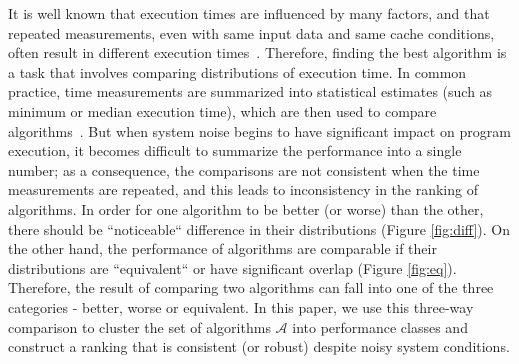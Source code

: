 \documentclass[conference]{IEEEtran}
\begin{document}
It is well known that execution times are influenced by many factors, and that repeated measurements, even with same input data and same cache conditions, often result in different execution times~\cite{peise2014cache,hoefler2010characterizing,peise2012performance}. Therefore, finding the best algorithm is a task that involves comparing distributions of execution time.
%
In common practice, time measurements are summarized into statistical estimates (such as minimum or median execution time), which are then used to compare algorithms~\cite{peise2019elaps}. But when system noise begins to have significant impact on program execution, it becomes difficult to summarize the performance into a single number; as a consequence, the comparisons are not consistent when the time measurements are repeated, and this leads to inconsistency in the ranking of algorithms.
In order for one algorithm to be better (or worse) than the other, there should be ``noticeable`` difference in their distributions (Figure \ref{fig:diff}). On the other hand, the performance of algorithms are comparable if their distributions are ``equivalent`` or have significant overlap (Figure \ref{fig:eq}). 
%
Therefore, the result of comparing two algorithms can fall into one of the three categories - better, worse or equivalent. 
In this paper, we use this three-way comparison to cluster the set of algorithms $\mathcal{A}$ into performance classes and construct a ranking that is consistent (or robust) despite noisy system conditions.
%
\end{document}
